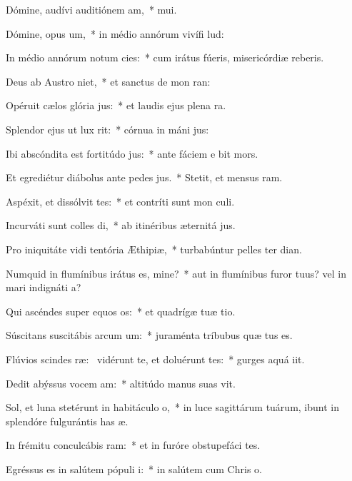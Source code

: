 \item Dómine, audívi auditiónem am,~*  mui.
\item Dómine, opus um,~* in médio annórum vivífi lud:
\item In médio annórum notum cies:~* cum irátus fúeris, misericórdiæ reberis.
\item Deus ab Austro niet,~* et sanctus de mon ran:
\item Opéruit cælos glória jus:~* et laudis ejus plena  ra.
\item Splendor ejus ut lux rit:~* córnua in máni jus:
\item Ibi abscóndita est fortitúdo jus:~* ante fáciem e bit mors.
\item Et egrediétur diábolus ante pedes jus.~* Stetit, et mensus  ram.
\item Aspéxit, et dissólvit tes:~* et contríti sunt mon culi.
\item Incurváti sunt colles di,~* ab itinéribus æternitá jus.
\item Pro iniquitáte vidi tentória Æthipiæ,~* turbabúntur pelles ter dian.
\item Numquid in flumínibus irátus es, mine?~* aut in flumínibus furor tuus? vel in mari indignáti a?
\item Qui ascéndes super equos os:~* et quadrígæ tuæ tio.
\item Súscitans suscitábis arcum um:~* juraménta tríbubus quæ tus es.
\item Flúvios scindes ræ:~\pscross{} vidérunt te, et doluérunt tes:~* gurges aquá iit.
\item Dedit abýssus vocem am:~* altitúdo manus suas vit.
\item Sol, et luna stetérunt in habitáculo o,~* in luce sagittárum tuárum, ibunt in splendóre fulgurántis has æ.
\item In frémitu conculcábis ram:~* et in furóre obstupefáci tes.
\item Egréssus es in salútem pópuli i:~* in salútem cum Chris o.
